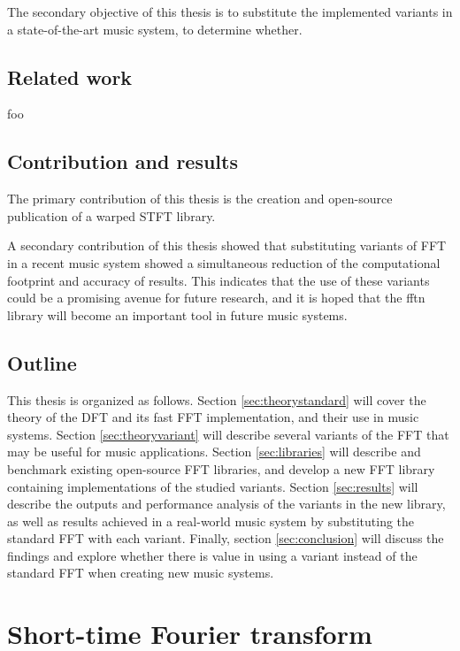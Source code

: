 \documentclass[letter,12pt,notitlepage]{article}
\begin{document}
The secondary objective of this thesis is to substitute the implemented variants in a state-of-the-art music system, to determine whether.

\subsection{Related work}

foo

\subsection{Contribution and results}

The primary contribution of this thesis is the creation and open-source publication of a warped STFT library.

A secondary contribution of this thesis showed that substituting variants of FFT in a recent music system  showed a simultaneous reduction of the computational footprint and accuracy of results. This indicates that the use of these variants could be a promising avenue for future research, and it is hoped that the fftn library will become an important tool in future music systems.

\subsection{Outline}

This thesis is organized as follows. Section \ref{sec:theorystandard} will cover the theory of the DFT and its fast FFT implementation, and their use in music systems. Section \ref{sec:theoryvariant} will describe several variants of the FFT that may be useful for music applications. Section \ref{sec:libraries} will describe and benchmark existing open-source FFT libraries, and develop a new FFT library containing implementations of the studied variants. Section \ref{sec:results} will describe the outputs and performance analysis of the variants in the new library, as well as results achieved in a real-world music system by substituting the standard FFT with each variant. Finally, section \ref{sec:conclusion} will discuss the findings and explore whether there is value in using a variant instead of the standard FFT when creating new music systems.

\vfill
\clearpage

\section{Short-time Fourier transform}
\label{sec:theorytf}
\end{document}
